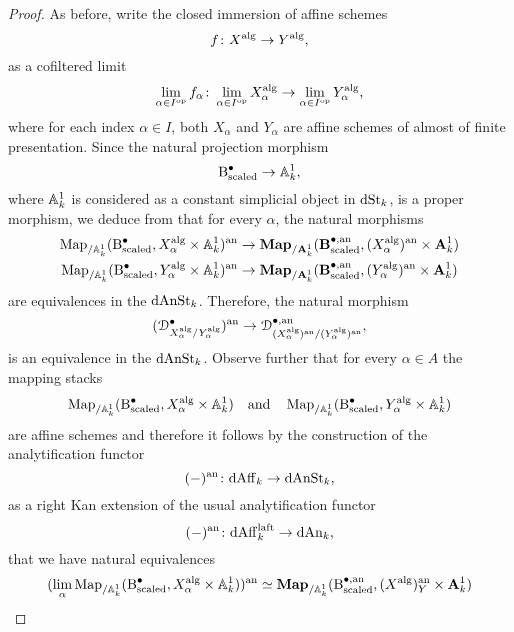 \documentclass[10pt,a4paper,reqno]{amsart} %
\theoremstyle{plain}
\theoremstyle{definition}
\theoremstyle{remark}
\numberwithin{equation}{section}
\begin{document}
\begin{proof}
    As before, write the closed immersion of affine schemes
        \[
            f \colon X^\mathrm{alg} \to Y^\mathrm{alg},  
        \]
    as a cofiltered limit 
        \[\lim_{\alpha \in I^\mathrm{op}} f_\alpha \colon \lim_{\alpha \in I^\mathrm{op}} X_\alpha^\mathrm{alg} \to \lim_{\alpha \in I^\mathrm{op}} Y_\alpha^\mathrm{alg},\]
    where for each index $\alpha \in I$, both $X_\alpha$
    and $Y_\alpha$ are affine schemes of almost of finite presentation. Since the natural projection morphism
        \[
            \mathrm{B}_\mathrm{scaled}^\bullet \to \mathbb A^1_k, 
        \]
    where $\mathbb A^1_k$ is considered as a constant simplicial object in $\mathrm{dSt}_k$, is a proper morphism, we deduce from \cite[Theorem 6.13]{Holstein_Analytification_of_mapping_stacks}
    that for every $\alpha$, the natural morphisms
        \begin{align*}
            \operatorname{Map}_{/\mathbb A^1_k}(\mathrm{B}^\bullet_\mathrm{scaled}, X_\alpha^\mathrm{alg} \times \mathbb A^1_k)^\mathrm{an} & \to \mathbf{Map}_{/ \mathbf A^1_k}(\mathbf{B}^{\bullet, \mathrm{an}}_\mathrm{scaled} , (X_\alpha^\mathrm{alg})^\mathrm{an} \times \mathbf A^1_k) \\
            \operatorname{Map}_{/\mathbb A^1_k}(\mathrm{B}^\bullet_\mathrm{scaled}, Y_\alpha^\mathrm{alg} \times \mathbb A^1_k)^\mathrm{an} & \to \mathbf{Map}_{/ \mathbf A^1_k}(\mathbf{B}^{\bullet, \mathrm{an}}_\mathrm{scaled} , (Y_\alpha^\mathrm{alg})^\mathrm{an} \times \mathbf A^1_k)
        \end{align*}
    are equivalences in the \infcat $\mathrm{dAnSt}_k$. Therefore, the natural morphism
        \[
            (\mathcal D_{X^\mathrm{alg}_\alpha/Y^\mathrm{alg}_\alpha}^\bullet )^\mathrm{an}  \to \mathcal D_{(X_\alpha ^\mathrm{alg})^\mathrm{an}/ (Y_\alpha ^\mathrm{alg})^\mathrm{an}}^{\bullet, \mathrm{an}},
        \]
    is an equivalence in the \infcat $\mathrm{dAnSt}_k$. Observe further that for every $\alpha \in A$ the mapping stacks
        \[
            \operatorname{Map}_{/ \mathbb A^1_k}(\mathrm{B}^\bullet_\mathrm{scaled}, X_\alpha^\mathrm{alg} \times \mathbb A^1_k) \quad \mathrm{and} \quad \operatorname{Map}_{/ \mathbb A^1_k}(\mathrm{B}^\bullet_\mathrm{scaled}, Y_\alpha^\mathrm{alg} \times \mathbb A^1_k)  
        \]
    are affine schemes and therefore it follows by the construction of the analytification functor
        \[
            (-)^\mathrm{an} \colon \mathrm{dAff}_k \to \mathrm{dAnSt}_k,  
        \]
    as a right Kan extension of the usual analytification functor
        \[
            (-)^\mathrm{an} \colon \mathrm{dAff}^{\mathrm{laft}}_k \to \mathrm{dAn}_k,  
        \]
    that we have natural equivalences
        \begin{align*}
           ( \lim_\alpha \Map_{/\bbA^1_k}(\mathrm{B}^\bullet_\mathrm{scaled}, X_\alpha\alg \times \bbA^1_k)) \an & \simeq \bfMap_{/\bbA^1_k}(\mathrm{B}^{\bullet, \mathrm{an}}_\mathrm{scaled}, (X\alg)\an_Y \times \bA^1_k) \\

\end{align*}
\end{proof}
\end{document}
